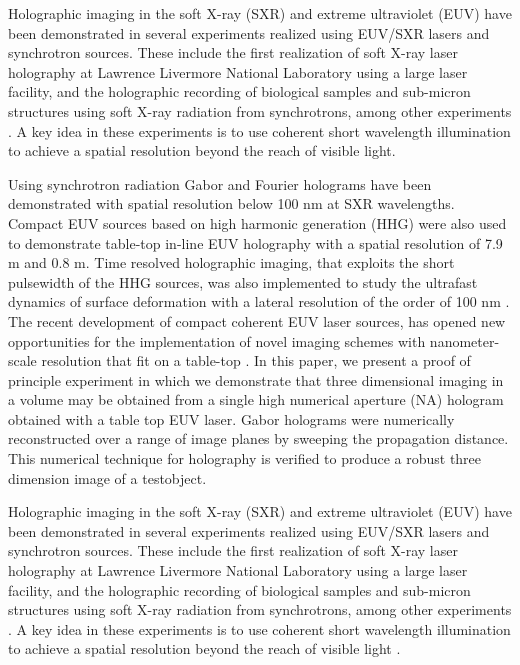 \documentclass[]{IEEEphot}
\begin{document}
Holographic imaging in the soft X-ray (SXR) and extreme ultraviolet (EUV) have been demonstrated in several experiments realized using EUV/SXR lasers and synchrotron sources. These include the first realization of soft X-ray laser holography at Lawrence Livermore National Laboratory using a large laser facility, and the holographic recording of biological samples and sub-micron structures using soft X-ray radiation from synchrotrons, among other experiments \cite{Mizuuchi2002, Mizuuchi2003}.  A key idea in these experiments is to use coherent short wavelength illumination to achieve a spatial resolution beyond the reach of visible light.  

Using synchrotron radiation Gabor and Fourier holograms have been demonstrated \cite{Mizuuchi2003}
 with spatial resolution below 100 nm at SXR wavelengths.  Compact EUV sources based on high harmonic generation (HHG) were also used to demonstrate table-top in-line EUV holography with a spatial resolution of 7.9 m  and 0.8 m.  Time resolved holographic imaging, that exploits the short pulsewidth of the HHG sources, was also implemented to study the ultrafast dynamics of surface deformation with a lateral resolution of the order of 100 nm \cite{Mizuuchi2005,Nakanishi2007}.  The recent development of compact coherent EUV laser sources, \cite{Ott2006} has opened new opportunities for the implementation of novel imaging schemes with nanometer-scale resolution that fit on a table-top \cite{Mizuuchi2003,Ott2006}. In this paper, we present a proof of principle experiment in which we demonstrate that three dimensional imaging in a volume may be obtained from a single high numerical  aperture (NA) hologram obtained with a table top EUV laser. Gabor holograms were numerically reconstructed over a range of image planes by sweeping the propagation distance. This numerical  technique for holography is verified to produce a robust three dimension image of a test\break object.  

Holographic imaging in the soft X-ray (SXR) and extreme ultraviolet (EUV) have \cite{Or2006a} been demonstrated in several experiments realized using EUV/SXR lasers and synchrotron sources. These include the first realization of soft X-ray laser holography at Lawrence Livermore National Laboratory using a large laser facility, and the holographic recording of biological samples and sub-micron structures using soft X-ray radiation from synchrotrons, among other experiments \cite{Or2007, Or2008}.  A key idea in these experiments is to use coherent short wavelength illumination to achieve a spatial resolution beyond the reach of visible light \cite{Or2005a}.  
\end{document}
